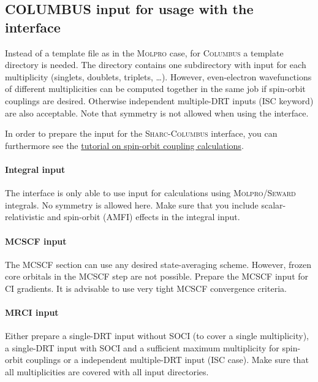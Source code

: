 \documentclass[a4paper,11pt,DIV=15,openany]{scrbook}
\newcommand{\sharc}{\textsc{Sharc}}
\begin{document}
\subsection{COLUMBUS input for usage with the interface}

Instead of a template file as in the \textsc{Molpro} case, for \textsc{Columbus} a template directory is needed.
The directory contains one subdirectory with input for each multiplicity (singlets, doublets, triplets, \dots). However, even-electron wavefunctions of different multiplicities can be computed together in the same job if spin-orbit couplings are desired. Otherwise independent multiple-DRT inputs (ISC keyword) are also acceptable. Note that symmetry is not allowed when using the interface.

In order to prepare the input for the \sharc-\textsc{Columbus} interface, you can furthermore see the 
\href{http://www.univie.ac.at/columbus/docs_COL70/tutorial-SO.pdf}{tutorial on spin-orbit coupling calculations}.

\paragraph{Integral input}

The interface is only able to use input for calculations using \textsc{Molpro/Seward} integrals. No symmetry is allowed here. Make sure that you include scalar-relativistic and spin-orbit (AMFI) effects in the integral input. 

\paragraph{MCSCF input}

The MCSCF section can use any desired state-averaging scheme. However, frozen core orbitals in the MCSCF step are not possible. Prepare the MCSCF input for CI gradients. It is advisable to use very tight MCSCF convergence criteria.

\paragraph{MRCI input}

Either prepare a single-DRT input without SOCI (to cover a single multiplicity), a single-DRT input with SOCI and a sufficient maximum multiplicity for spin-orbit couplings or a independent multiple-DRT input (ISC case). Make sure that all multiplicities are covered with all input directories.
\end{document}
